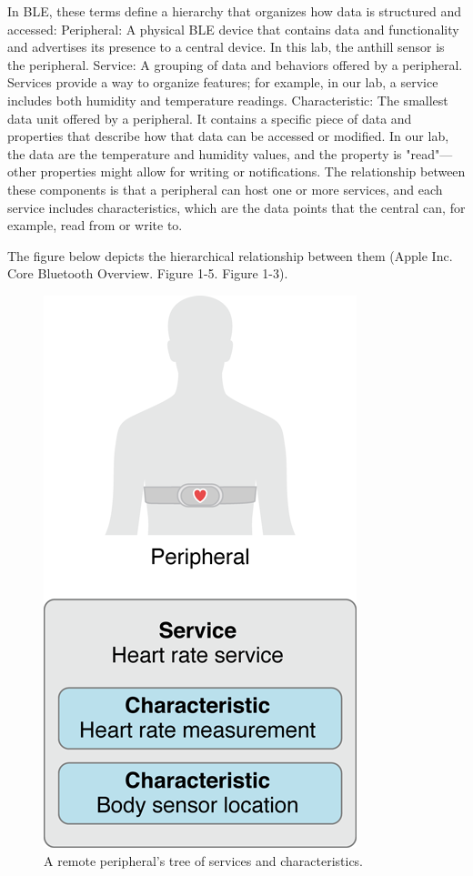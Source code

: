 \documentclass{lab}
\begin{document}
In BLE, these terms define a hierarchy that organizes how data is structured and accessed:
Peripheral: A physical BLE device that contains data and functionality and advertises its presence to a central device. In this lab, the anthill sensor is the peripheral.
Service: A grouping of data and behaviors offered by a peripheral. Services provide a way to organize features; for example, in our lab, a service includes both humidity and temperature readings.
Characteristic: The smallest data unit offered by a peripheral. It contains a specific piece of data and properties that describe how that data can be accessed or modified. In our lab, the data are the temperature and humidity values, and the property is "read"—other properties might allow for writing or notifications.
The relationship between these components is that a peripheral can host one or more services, and each service includes characteristics, which are the data points that the central can, for example, read from or write to.

The figure below depicts the hierarchical relationship between them (Apple Inc. Core Bluetooth Overview. Figure 1-5. Figure 1-3).


\begin{figure}[h]
    \begin{center}
    \includegraphics[height=0.25\textheight]{images/CBPeripheralData.png} 
    \caption{A remote peripheral’s tree of services and characteristics.}
    \end{center}
\end{figure}
\end{document}
